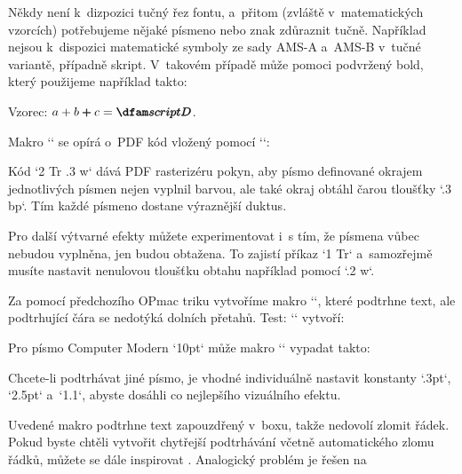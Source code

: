Někdy není k~dizpozici tučný řez fontu, a~přitom (zvláště v~matematických vzorcích) potřebujeme nějaké písmeno nebo znak zdůraznit tučně. Například nejsou k~dispozici matematické symboly ze sady AMS-A a~AMS-B v~tučné variantě, případně skript. V~takovém případě může pomoci podvržený bold, který použijeme například takto: 

\begtt
Vzorec: $a+b\fakebold{+}c = \fakebold{\script D}$. 
\endtt


Makro `\fakebold` se opírá o~PDF kód vložený pomocí `\pdfliteral`: 

\begtt
\def\fakebold#1{\pdfliteral{2 Tr .3 w}#1\pdfliteral{0 Tr 0 w}} 
\endtt


Kód `2 Tr .3 w` dává PDF rasterizéru pokyn, aby písmo definované okrajem jednotlivých písmen nejen vyplnil barvou, ale také okraj obtáhl čarou tloušťky `.3 bp`. Tím každé písmeno dostane výraznější duktus. 



Pro další výtvarné efekty můžete experimentovat i~s tím, že písmena vůbec nebudou vyplněna, jen budou obtažena. To zajistí příkaz `1 Tr` a~samozřejmě musíte nastavit nenulovou tloušťku obtahu například pomocí `.2 w`. 


 


Za pomocí předchozího OPmac triku vytvoříme makro ``, které podtrhne text, ale podtrhující čára se nedotýká dolních přetahů. Test: `` vytvoří: 






Pro písmo Computer Modern `10pt` může makro `\underlinee` vypadat takto: 

\begtt
\def\underlinee#1{%
   \leavevmode\vbox to0pt{\vss 
      \hrule height.3pt 
      \vskip-\baselineskip \kern2.5pt 
      \localcolor 
      \hbox{\strut\rlap{\White\pdfliteral{2 Tr 1.1 w}#1\pdfliteral{0 Tr 0 w}}#1} 
}} 
\endtt


Chcete-li podtrhávat jiné písmo, je vhodné individuálně nastavit konstanty `.3pt`, `2.5pt` a~`1.1`, abyste dosáhli co nejlepšího vizuálního efektu. 



Uvedené makro podtrhne text zapouzdřený v~boxu, takže nedovolí zlomit řádek. Pokud byste chtěli vytvořit chytřejší podtrhávání včetně automatického zlomu řádků, můžete se dále inspirovat . Analogický problém je řešen na  




